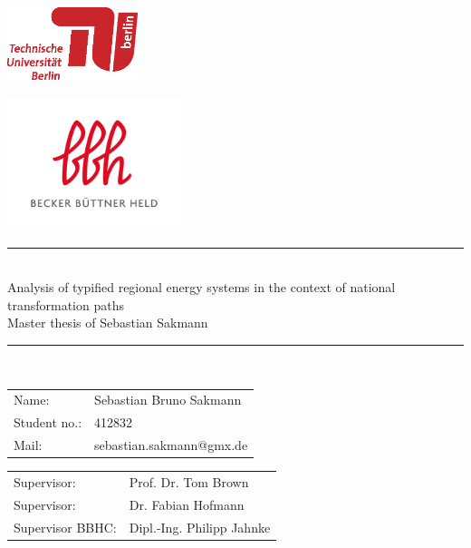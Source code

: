 \begin{center}
\singlespacing
\thispagestyle{empty}

\begin{minipage}{0.35\textwidth}
	\centering
	\includegraphics[width=1.5in]{Bilder/tu-logo.eps} 
\end{minipage}
\hfill %
\begin{minipage}{0.35\textwidth}
	\centering
	\includegraphics[width=2in]{Bilder/BBH_Logo.jpg} 
\end{minipage}

\vspace{1.5cm}

\rule{\linewidth}{0.2 mm} \\[0.4 cm]
    {\Huge
        Analysis of typified regional energy systems in the context of national transformation paths
    }\\[7mm]
    
    {\centering \Large
Master thesis of Sebastian Sakmann
    }
\rule{\linewidth}{0.2 mm} \\

\vspace{1.5cm}

\begin{tabular}{ll}
    Name: & Sebastian Bruno Sakmann \\
    Student no.: & 412832 \\
    Mail: & sebastian.sakmann@gmx.de
\end{tabular}

\vspace{1.5cm}

\begin{tabular}{ll}
    Supervisor: & Prof. Dr. Tom Brown \\[1mm]
    Supervisor:  & Dr. Fabian Hofmann\\[1mm]
    Supervisor BBHC: & Dipl.-Ing. Philipp Jahnke \\[1mm]
 \end{tabular}


\end{center}
